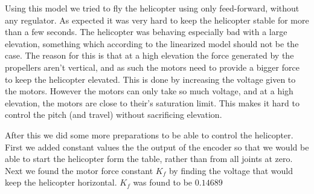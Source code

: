 \iffalse
Linearizing the system gives

\begin{subequations}
	\begin{align}
		\ddot{\tilde p} &= \partialderiv{\ddot{\tilde{p}}}{\tilde p} + \partialderiv{\ddot{\tilde p}}{\tilde e} + \partialderiv{\ddot{\tilde p}}{\tilde \lambda} + \partialderiv{\ddot{\tilde p}}{\tilde V_s} + \partialderiv{\ddot{\tilde p}}{\tilde V_d} = 0 + 0 + 0 + 0 + \frac{L_1}{J_p} \tilde V_d = \frac{L_1}{J_p} \tilde V_d = K_1 \tilde V_d\\
		\ddot{\tilde e} &= \partialderiv{\ddot{\tilde{e}}}{\tilde p} + \partialderiv{\ddot{\tilde{e}}}{\tilde e} + \partialderiv{\ddot{\tilde{e}}}{\tilde \lambda} + \partialderiv{\ddot{\tilde e}}{\tilde V_s} + \partialderiv{\ddot{\tilde e}}{\tilde V_d} = 0 + 0 + 0 + \frac{L_3}{J_e} \tilde V_s + 0 = \frac{L_3}{J_e} \tilde V_s = K_2 \tilde V_s\\
		\ddot{\tilde \lambda} &= \partialderiv{\ddot{\tilde \lambda}}{\tilde p} + \partialderiv{\ddot{\tilde \lambda}}{\tilde p} + \partialderiv{\ddot{\tilde \lambda}}{\tilde \lambda} + \partialderiv{\ddot{\tilde \lambda}}{\tilde V_s} + \partialderiv{\ddot{\tilde \lambda}}{\tilde V_d} = -\frac{L_2}{J_{\lambda}} \tilde p + 0 + 0 + 0 + 0 = -\frac{L_2}{J_{\lambda}} \tilde p = K_3 \tilde p 
	\end{align}
\end{subequations}
\fi

Using this model we tried to fly the helicopter using only feed-forward, without any regulator. As expected it was very hard to keep the helicopter stable for more than a few seconds. The helicopter was behaving especially bad with a large elevation, something which according to the linearized model should not be the case. The reason for this is that at a high elevation the force generated by the propellers aren't vertical, and as such the motors need to provide a bigger force to keep the helicopter elevated. This is done by increasing the voltage given to the motors. However the motors can only take so much voltage, and at a high elevation, the motors are  close to their's saturation limit. This makes it hard to control the pitch (and travel) without sacrificing elevation.

After this we did some more preparations to be able to control the helicopter. First we added constant values the the output of the encoder so that we would be able to start the helicopter form the table, rather than from all joints at zero. Next we found the motor force constant $K_f$ by finding the voltage that would keep the helicopter horizontal. $K_f$ was found to be $0.14689$ 